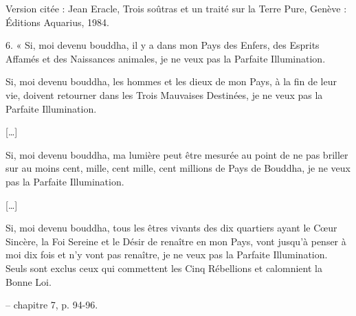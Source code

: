 Version citée : Jean Eracle, Trois soûtras et un traité sur la Terre Pure, Genève : Éditions Aquarius, 1984.

\begin{singlequote}
    6.	« Si, moi devenu bouddha, il y a dans mon Pays des Enfers, des Esprits Affamés et des Naissances animales, je ne veux pas la Parfaite Illumination.

Si, moi devenu bouddha, les hommes et les dieux de mon Pays, à la fin de leur vie, doivent retourner dans les Trois Mauvaises Destinées, je ne veux pas la Parfaite Illumination.
 
[…]

Si, moi devenu bouddha, ma lumière peut être mesurée au point de ne pas briller sur au moins cent, mille, cent mille, cent millions de Pays de Bouddha, je ne veux pas la Parfaite Illumination.

[…]

Si, moi devenu bouddha, tous les êtres vivants des dix quartiers ayant le Cœur Sincère, la Foi Sereine et le Désir de renaître en mon Pays, vont jusqu’à penser à moi dix fois et n’y vont pas renaître, je ne veux pas la Parfaite Illumination. Seuls sont exclus ceux qui commettent les Cinq Rébellions et calomnient la Bonne Loi.

-- chapitre 7, p. 94-96.
\end{singlequote}

